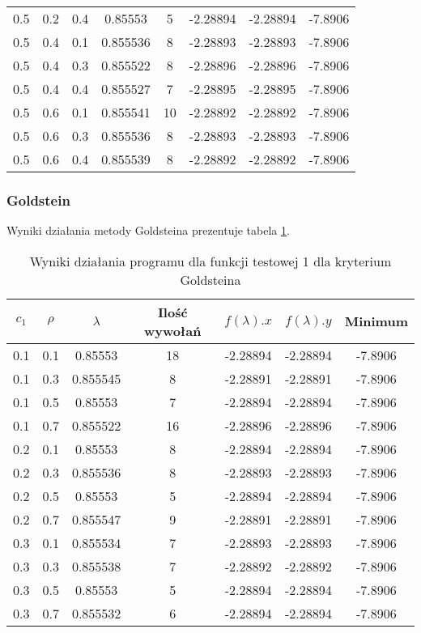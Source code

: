 \documentclass{classrep}
\begin{document}
\begin{table}
\begin{tabular}{|c|c|c|c|c|c|c|c|}
    0.5 & 0.2 & 0.4 & 0.85553 & 5 & -2.28894 & -2.28894 & -7.8906 \\
    0.5 & 0.4 & 0.1 & 0.855536 & 8 & -2.28893 & -2.28893 & -7.8906 \\
    0.5 & 0.4 & 0.3 & 0.855522 & 8 & -2.28896 & -2.28896 & -7.8906 \\
    0.5 & 0.4 & 0.4 & 0.855527 & 7 & -2.28895 & -2.28895 & -7.8906 \\
    0.5 & 0.6 & 0.1 & 0.855541 & 10 & -2.28892 & -2.28892 & -7.8906 \\
    0.5 & 0.6 & 0.3 & 0.855536 & 8 & -2.28893 & -2.28893 & -7.8906 \\
    0.5 & 0.6 & 0.4 & 0.855539 & 8 & -2.28892 & -2.28892 & -7.8906 \\
    \hline
  \end{tabular}
\end{table}

\subsubsection{Goldstein}

Wyniki działania metody Goldsteina prezentuje tabela \ref{goldstein1}.

\begin{table}
  \centering
  \caption{Wyniki działania programu dla funkcji testowej 1 dla kryterium Goldsteina}
  \label{goldstein1}
  \begin{tabular}{|c|c|c|c|c|c|c|}
    \hline
    $c_1$ & $\rho$ & $\lambda$ & Ilość wywołań & $f(\lambda).x$ & $f(\lambda).y$ & Minimum \\
    \hline
    0.1 & 0.1 & 0.85553 & 18 & -2.28894 & -2.28894 & -7.8906 \\
    0.1 & 0.3 & 0.855545 & 8 & -2.28891 & -2.28891 & -7.8906 \\
    0.1 & 0.5 & 0.85553 & 7 & -2.28894 & -2.28894 & -7.8906 \\
    0.1 & 0.7 & 0.855522 & 16 & -2.28896 & -2.28896 & -7.8906 \\
    0.2 & 0.1 & 0.85553 & 8 & -2.28894 & -2.28894 & -7.8906 \\
    0.2 & 0.3 & 0.855536 & 8 & -2.28893 & -2.28893 & -7.8906 \\
    0.2 & 0.5 & 0.85553 & 5 & -2.28894 & -2.28894 & -7.8906 \\
    0.2 & 0.7 & 0.855547 & 9 & -2.28891 & -2.28891 & -7.8906 \\
    0.3 & 0.1 & 0.855534 & 7 & -2.28893 & -2.28893 & -7.8906 \\
    0.3 & 0.3 & 0.855538 & 7 & -2.28892 & -2.28892 & -7.8906 \\
    0.3 & 0.5 & 0.85553 & 5 & -2.28894 & -2.28894 & -7.8906 \\
    0.3 & 0.7 & 0.855532 & 6 & -2.28894 & -2.28894 & -7.8906 \\
    \hline
  \end{tabular}
\end{table}
\end{document}
